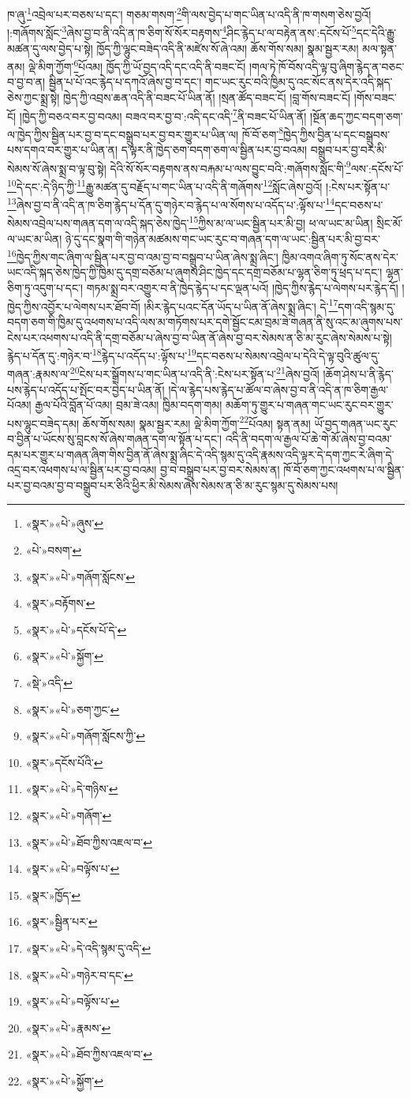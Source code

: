 ཁ་ཞུ་\footnote{«སྣར་»«པེ་»ཞུས་}འབྲེལ་པར་བཅས་པ་དང་། གཅམ་གསག་\footnote{«པེ་»བསག་}གི་ལས་བྱེད་པ་གང་ཡིན་པ་འདི་ནི་ཁ་གསག་ཅེས་བྱའོ། །:གཞོགས་སློང་\footnote{«སྣར་»«པེ་»གཞོག་སློངས་}ཞེས་བྱ་བ་ནི་འདི་ན་ཁ་ཅིག་སོ་སོར་བརྟགས་\footnote{«སྣར་»བརྟོགས་}ཤིང་རྙེད་པ་ལ་བརྟེན་ནས་:དངོས་པོ་\footnote{«སྣར་»«པེ་»དངོས་པོ་དེ་}དང་དེའི་རྒྱུ་མཚན་དུ་ལས་བྱེད་པ་སྟེ། ཁྱོད་ཀྱི་ལྷུང་བཟེད་འདི་ནི་མཛེས་སོ་ཞེ་འམ། ཆོས་གོས་སམ། སྣམ་སྦྱར་རམ། མལ་སྟན་ནམ། ལྡེ་མིག་ཀྱོག་\footnote{«སྣར་»«པེ་»སྐྱོག་}པོའམ། ཁྱོད་ཀྱི་ཡོ་བྱད་འདི་དང་འདི་ནི་བཟང་ངོ། །གལ་ཏེ་ཁོ་བོས་འདི་ལྟ་བུ་ཞིག་རྙེད་ན་བཅང་བ་བྱ་བ་ན། སྦྱིན་པ་པོ་འང་རྙེད་པ་དཀའོ་ཞེས་བྱ་བ་དང་། གང་ཡང་རུང་བའི་ཁྱིམ་དུ་འང་སོང་ནས་དེར་འདི་སྐད་ཅེས་ཀྱང་སྨྲ་སྟེ། ཁྱེད་ཀྱི་འབྲས་ཆན་འདི་ནི་བཟང་པོ་ཡིན་ནོ། །སྲན་ཚོད་བཟང་ངོ། །བླ་གོས་བཟང་ངོ། །གོས་བཟང་ངོ། །ཁྱེད་ཀྱི་བཅའ་བར་བྱ་བའམ། བཟའ་བར་བྱ་བ་:འདི་དང་འདི་\footnote{«སྡེ་»འདི་}ནི་བཟང་པོ་ཡིན་ནོ། །སྔོན་ཆད་ཀྱང་བདག་ཅག་ལ་ཁྱེད་ཀྱིས་སྦྱིན་པར་བྱ་བ་དང་བསྒྲུབ་པར་བྱ་བར་གྱུར་པ་ཡིན་ལ། ཁོ་བོ་ཅག་\footnote{«སྣར་»«པེ་»ཅག་ཀྱང་}ཁྱེད་ཀྱིས་བྱིན་པ་དང་བསྒྲུབས་པས་དགའ་བར་གྱུར་པ་ཡིན་ན། ད་ལྟར་ནི་ཁྱེད་ཅག་བདག་ཅག་ལ་སྦྱིན་པར་བྱ་བའམ། བསྒྲུབ་པར་བྱ་བར་མི་སེམས་སོ་ཞེས་སྨྲ་བ་ལྟ་བུ་སྟེ། དེའི་སོ་སོར་བརྟགས་ནས་བརྐམ་པ་ལས་བྱུང་བའི་:གཞོགས་སློང་གི་\footnote{«སྣར་»«པེ་»གཞོག་སློངས་ཀྱི་}ལས་:དངོས་པོ་\footnote{«སྣར་»དངོས་པོའི་}དེ་དང་:དེ་ཉིད་ཀྱི་\footnote{«སྣར་»«པེ་»དེ་གཉིས་}རྒྱུ་མཚན་དུ་བརྗོད་པ་གང་ཡིན་པ་འདི་ནི་གཞོགས་\footnote{«སྣར་»«པེ་»གཞོག་}སློང་ཞེས་བྱའོ། །:ངེས་པར་སྟོན་པ་\footnote{«སྣར་»«པེ་»ཐོབ་ཀྱིས་འཇལ་བ་}ཞེས་བྱ་བ་ནི་འདི་ན་ཁ་ཅིག་རྙེད་པ་དོན་དུ་གཉེར་བ་རྙེད་པ་ལ་སོགས་པ་འདོད་པ་:ལྟོས་པ་\footnote{«སྣར་»«པེ་»བལྟོས་པ་}དང་བཅས་པ་སེམས་འབྲེལ་པས་གཞན་དག་ལ་འདི་སྐད་ཅེས་ཁྱེད་\footnote{«སྣར་»ཁྱོད་}ཀྱིས་མ་ལ་ཡང་སྦྱིན་པར་མི་བྱ། ཕ་ལ་ཡང་མ་ཡིན། སྲིང་མོ་ལ་ཡང་མ་ཡིན། ཉེ་དུ་དང་སྣག་གི་གཉེན་མཚམས་གང་ཡང་རུང་བ་གཞན་དག་ལ་ཡང་:སྦྱིན་པར་མི་བྱ་བར་\footnote{«སྣར་»སྦྱིན་པར་}ཁྱེད་ཀྱིས་གང་ཞིག་ལ་སྦྱིན་པར་བྱ་བ་འམ་བྱ་བ་བསྒྲུབ་པ་ཡིན་ཞེས་སྨྲ་ཞིང་། ཁྱིམ་འགའ་ཞིག་ཏུ་སོང་ནས་དེར་ཡང་འདི་སྐད་ཅེས་ཁྱེད་ཀྱི་ཁྱིམ་དུ་དགྲ་བཅོམ་པ་ཞུགས་ཤིང་ཁྱེད་དང་དགྲ་བཅོམ་པ་ལྷན་ཅིག་ཏུ་ཕྲད་པ་དང་། ལྷན་ཅིག་ཏུ་འདུག་པ་དང་། གཏམ་སྨྲ་བར་འགྱུར་བ་ནི་ཁྱེད་རྙེད་པ་དང་ལྡན་པའོ། །ཁྱེད་ཀྱིས་རྙེད་པ་ལེགས་པར་རྙེད་དོ། །ཁྱེད་ཀྱིས་འབྱོར་པ་ལེགས་པར་ཐོབ་བོ། །མིར་རྙེད་པའང་དོན་ཡོད་པ་ཡིན་ནོ་ཞེས་སྨྲ་ཞིང་། དེ་\footnote{«སྣར་»«པེ་»དེ་འདི་སྙམ་དུ་འདི་}དག་འདི་སྙམ་དུ་བདག་ཅག་གི་ཁྱིམ་དུ་འཕགས་པ་འདི་ལས་མ་གཏོགས་པར་དགེ་སྦྱོང་ངམ་བྲམ་ཟེ་གཞན་ནི་སུ་འང་མ་ཞུགས་པས་ངེས་པར་འཕགས་པ་འདི་ནི་དགྲ་བཅོམ་པ་ཞེས་བྱ་བ་ཡིན་ནོ་ཞེས་བྱ་བར་སེམས་ན་ཅི་མ་རུང་ཞེས་སེམས་པ་སྟེ། རྙེད་པ་དོན་དུ་:གཉེར་བ་\footnote{«སྣར་»«པེ་»གཉེར་བ་དང་}རྙེད་པ་འདོད་པ་:ལྟོས་པ་\footnote{«སྣར་»«པེ་»བལྟོས་པ་}དང་བཅས་པ་སེམས་འབྲེལ་པ་དེའི་དེ་ལྟ་བུའི་ཚུལ་དུ་གཞན་:རྣམས་ལ་\footnote{«སྣར་»«པེ་»རྣམས་}ངེས་པར་སྒྲོགས་པ་གང་ཡིན་པ་འདི་ནི་:ངེས་པར་སྟོན་པ་\footnote{«སྣར་»«པེ་»ཐོབ་ཀྱིས་འཇལ་བ་}ཞེས་བྱའོ། །ཆོག་ཤེས་པ་ནི་རྙེད་པས་རྙེད་པ་འདོད་པ་སྤོང་བར་བྱེད་པ་ཡིན་ནོ། །དེ་ལ་རྙེད་པས་རྙེད་པ་ཚོལ་བ་ཞེས་བྱ་བ་ནི་འདི་ན་ཁ་ཅིག་རྒྱལ་པོའམ། རྒྱལ་པོའི་བློན་པོ་འམ། བྲམ་ཟེ་འམ། ཁྱིམ་བདག་གམ། མཆོག་ཏུ་གྱུར་པ་གཞན་གང་ཡང་རུང་བར་གྱུར་པས་ལྷུང་བཟེད་དམ། ཆོས་གོས་སམ། སྣམ་སྦྱར་རམ། ལྡེ་མིག་ཀྱོག་\footnote{«སྣར་»«པེ་»སྐྱོག་}པོའམ། སྟན་ནམ། ཡོ་བྱད་གཞན་ཡང་རུང་བ་བྱིན་པ་ཡོངས་སུ་བླངས་སོ་ཞེས་གཞན་དག་ལ་སྟོན་པ་དང་། འདི་ནི་བདག་ལ་རྒྱལ་པོ་ཆེ་གེ་མོ་ཞེས་བྱ་བའམ་དམ་པར་གྱུར་པ་གཞན་ཞིག་གིས་བྱིན་ནོ་ཞེས་སྨྲ་ཞིང་དེ་འདི་སྙམ་དུ་འདི་རྣམས་འདི་ལྟར་དེ་དག་ཀྱང་རེ་ཞིག་དེ་འདྲ་བར་འཕགས་པ་ལ་སྦྱིན་པར་བྱ་བའམ། བྱ་བ་བསྒྲུབ་པར་བྱ་བར་སེམས་ན། ཁོ་བོ་ཅག་ཀྱང་འཕགས་པ་ལ་སྦྱིན་པར་བྱ་བའམ་བྱ་བ་བསྒྲུབ་པར་ཅིའི་ཕྱིར་མི་སེམས་ཞེས་སེམས་ན་ཅི་མ་རུང་སྙམ་དུ་སེམས་པས། 